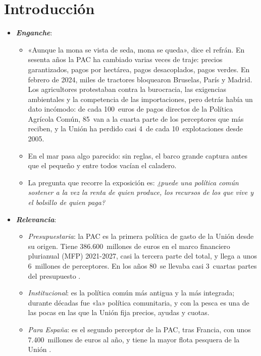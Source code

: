 \documentclass[11pt]{article}
\begin{document}
\tceetitulo

\section*{Introducción}

\begin{itemize}
\item \textbf{\emph{Enganche}}:
  \begin{itemize}
  \item «Aunque la mona se vista de seda, mona se queda», dice el refrán. En sesenta años la PAC ha cambiado varias veces de traje: precios garantizados, pagos por hectárea, pagos desacoplados, pagos verdes. En febrero de 2024, miles de tractores bloquearon Bruselas, París y Madrid. Los agricultores protestaban contra la burocracia, las exigencias ambientales y la competencia de las importaciones, pero detrás había un dato incómodo: de cada 100~euros de pagos directos de la Política Agrícola Común, 85~van a la cuarta parte de los perceptores que más reciben\nocite{CE2025DistribucionPagos}, y la Unión ha perdido casi 4~de cada 10~explotaciones desde 2005\nocite{Eurostat2026Explotaciones}.
  \item En el mar pasa algo parecido: sin reglas, el barco grande captura antes que el pequeño y entre todos vacían el caladero.
  \item La pregunta que recorre la exposición es: \emph{¿puede una política común sostener a la vez la renta de quien produce, los recursos de los que vive y el bolsillo de quien paga?}
  \end{itemize}

\item \textbf{\emph{Relevancia}}:
  \begin{itemize}
  \item \emph{Presupuestaria}: la PAC es la primera política de gasto de la Unión desde su origen. Tiene 386.600~millones de euros en el marco financiero plurianual (MFP) 2021-2027, casi la tercera parte del total, y llega a unos 6~millones de perceptores\nocite{CE2026FondosPAC,CE2025DistribucionPagos}. En los años 80~se llevaba casi 3~cuartas partes del presupuesto .
  \item \emph{Institucional}: es la política común más antigua y la más integrada; durante décadas fue «la» política comunitaria, y con la pesca es una de las pocas en las que la Unión fija precios, ayudas y cuotas.
  \item \emph{Para España}: es el segundo perceptor de la PAC, tras Francia, con unos 7.400~millones de euros al año\nocite{FEGA2026Informe}, y tiene la mayor flota pesquera de la Unión  .
  \end{itemize}


\end{itemize}
\end{document}
